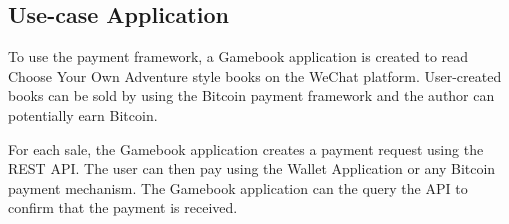 \subsection{Use-case Application}

To use the payment framework, a Gamebook application is created to read Choose Your Own Adventure style books on the WeChat platform. User-created books can be sold by using the Bitcoin payment framework and the author can potentially earn Bitcoin.

For each sale, the Gamebook application creates a payment request using the REST API. The user can then pay using the Wallet Application or any Bitcoin payment mechanism. The Gamebook application can the query the API to confirm that the payment is received. 